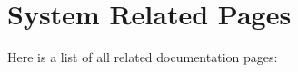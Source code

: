 \section{System Related Pages}
Here is a list of all related documentation pages:\begin{CompactList}
\item {}

\end{CompactList}
